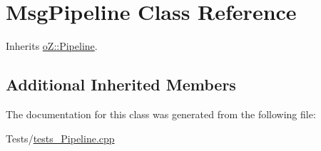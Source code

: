 \hypertarget{class_msg_pipeline}{}\section{Msg\+Pipeline Class Reference}
\label{class_msg_pipeline}


Inherits \mbox{\hyperlink{classo_z_1_1_pipeline}{o\+Z\+::\+Pipeline}}.

\subsection*{Additional Inherited Members}


The documentation for this class was generated from the following file\+:\begin{DoxyCompactItemize}
\item 
Tests/\mbox{\hyperlink{tests___pipeline_8cpp}{tests\+\_\+\+Pipeline.\+cpp}}\end{DoxyCompactItemize}
